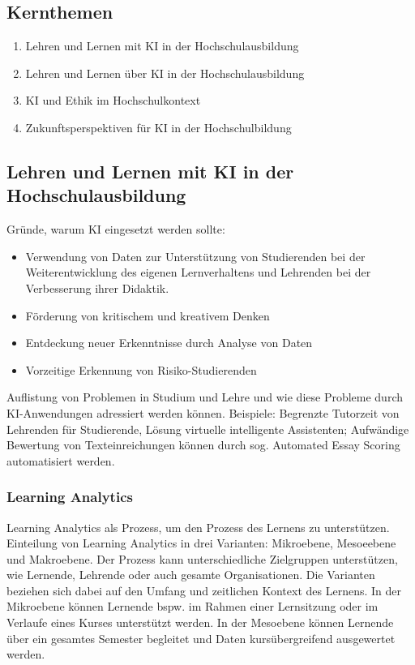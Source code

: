 \subsection*{Kernthemen}
\begin{enumerate}
    \item Lehren und Lernen mit KI in der Hochschulausbildung
    \item Lehren und Lernen über KI in der Hochschulausbildung
    \item KI und Ethik im Hochschulkontext
    \item Zukunftsperspektiven für KI in der Hochschulbildung
\end{enumerate}


\subsection{Lehren und Lernen mit KI in der Hochschulausbildung}

Gründe, warum KI eingesetzt werden sollte:
\begin{itemize}
    \item Verwendung von Daten zur Unterstützung von Studierenden bei der Weiterentwicklung des eigenen Lernverhaltens und Lehrenden bei der Verbesserung ihrer Didaktik.
    \item Förderung von kritischem und kreativem Denken
    \item Entdeckung neuer Erkenntnisse durch Analyse von Daten
    \item Vorzeitige Erkennung von Risiko-Studierenden
\end{itemize}

Auflistung von Problemen in Studium und Lehre und wie diese Probleme durch KI-Anwendungen adressiert werden können. Beispiele: Begrenzte Tutorzeit von Lehrenden für Studierende, Lösung virtuelle intelligente Assistenten; Aufwändige Bewertung von Texteinreichungen können durch sog. Automated Essay Scoring automatisiert werden.

\subsubsection*{Learning Analytics}
Learning Analytics als Prozess, um den Prozess des Lernens zu unterstützen. Einteilung von Learning Analytics in drei Varianten: Mikroebene, Mesoeebene und Makroebene. Der Prozess kann unterschiedliche Zielgruppen unterstützen, wie Lernende, Lehrende oder auch gesamte Organisationen. Die Varianten beziehen sich dabei auf den Umfang und zeitlichen Kontext des Lernens. In der Mikroebene können Lernende bspw. im Rahmen einer Lernsitzung oder im Verlaufe eines Kurses unterstützt werden. In der Mesoebene können Lernende über ein gesamtes Semester begleitet und Daten kursübergreifend ausgewertet werden.

